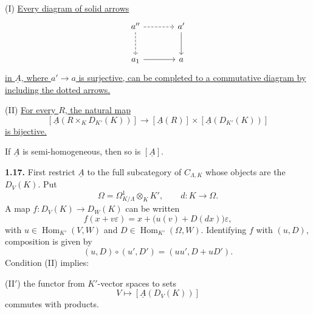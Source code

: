 (I) \underline{Every diagram of solid arrows}
\[
\begin{tikzcd}[row sep=large,column sep=large]
a'' \arrow[r,dashed] \arrow[d,dashed]
 & a' \arrow[d] \\
a_1 \arrow[r] & a
\end{tikzcd}
\]
\underline{in $\underline A$, where $a'\longrightarrow a$ is
surjective, can be completed to a commutative diagram by including the
dotted arrows.}

(II) \underline{For every $R$, the natural map}
\[
 [\underline A(R\times_KD_{K'}(K))]
 \longrightarrow
 [\underline A(R)]\times[\underline A(D_{K'}(K))]
\]
\underline{is bijective.}

If $\underline A$ is semi-homogeneous, then so is $[\underline A]$.

\textbf{1.17.} First restrict $\underline A$ to the full subcategory
of $C_{\Lambda,K}$ whose objects are the $D_V(K)$. Put
\[
 \Omega=\Omega^1_{K/\Lambda}\otimes_KK',
 \qquad d:K\longrightarrow\Omega.
\]
A map $f:D_V(K)\longrightarrow D_W(K)$ can be written
\[
 f(x+v\varepsilon)
 =x+\bigl(u(v)+D(dx)\bigr)\varepsilon,
\]
with $u\in\operatorname{Hom}_{K'}(V,W)$ and
$D\in\operatorname{Hom}_{K'}(\Omega,W)$. Identifying $f$ with
$(u,D)$, composition is given by
\[
 (u,D)\circ(u',D')=(uu',D+uD').
\]
Condition (II) implies:

(II$'$) the functor from $K'$-vector spaces to sets
\[
 V\longmapsto[\underline A(D_V(K))]
\]
commutes with products.

